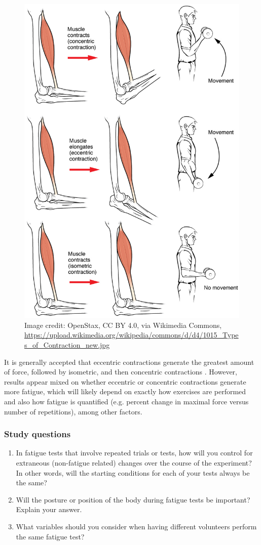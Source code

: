 \documentclass{article}
\begin{document}
\begin{figure}[!htbp]
\centering
\includegraphics[width=0.5\linewidth]{files/EPpXta8zJdzN048lz8AR-ed134e0857c6a220c0466e6d95d38838.jpeg}
\caption[]{Image credit: OpenStax, CC BY 4.0, via Wikimedia Commons, \href{https://upload.wikimedia.org/wikipedia/commons/d/d4/1015\_Types\_of\_Contraction\_new.jpg}{https://upload.wikimedia.org/wikipedia/commons/d/d4/1015\_Types\_of\_Contraction\_new.jpg}}
\label{OyVvhPkhSg}
\end{figure}

It is generally accepted that eccentric contractions generate the greatest amount of force, followed by isometric, and then concentric contractions \citep{radak2018physiology, feher2017quantitative}. However, results appear mixed on whether eccentric or concentric contractions generate more fatigue, which will likely depend on exactly how exercises are performed and also how fatigue is quantified (e.g. percent change in maximal force versus number of repetitions), among other factors.

\subsubsection{Study questions}

\begin{enumerate}
\item In fatigue tests that involve repeated trials or tests, how will you control for extraneous (non-fatigue related) changes over the course of the experiment? In other words, will the starting conditions for each of your tests always be the same?
\item Will the posture or position of the body during fatigue tests be important? Explain your answer.
\item What variables should you consider when having different volunteers perform the same fatigue test?
\end{enumerate}
\end{document}
